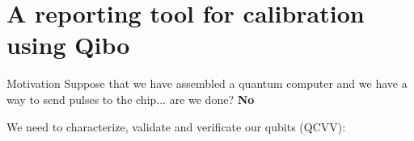 \documentclass[11p,aspectratio=169]{beamer}
\begin{document}
\section{A reporting tool for calibration using Qibo}

\begin{frame}{Motivation}
    Suppose that we have assembled a quantum computer and we have a way
    to send pulses to the chip... are we done? {\color{red} \textbf{No} }

    We need to { \color{blue} characterize}, { \color{blue} validate} and { \color{blue} verificate} our qubits (QCVV):
                

\end{frame}
\end{document}
